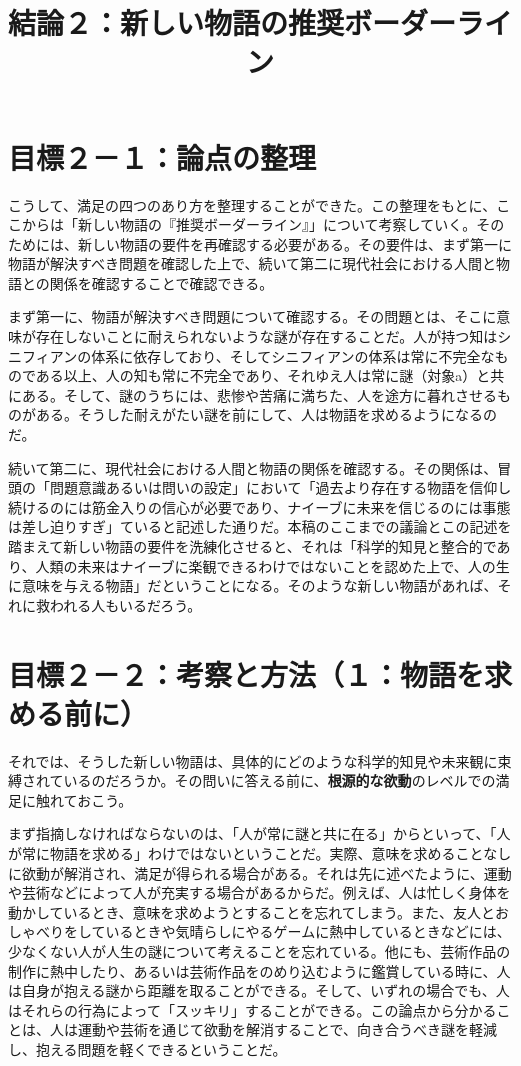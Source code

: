 \documentclass[8pt, a5paper]{ltjsarticle}
\title{結論２：新しい物語の推奨ボーダーライン}
\author{}
\date{}
\begin{document}
\maketitle

\section{目標２－１：論点の整理}\label{ux76eeux6a19uxff12uxff11ux8ad6ux70b9ux306eux6574ux7406}

こうして、満足の四つのあり方を整理することができた。この整理をもとに、ここからは「新しい物語の『推奨ボーダーライン』」について考察していく。そのためには、新しい物語の要件を再確認する必要がある。その要件は、まず第一に物語が解決すべき問題を確認した上で、続いて第二に現代社会における人間と物語との関係を確認することで確認できる。

まず第一に、物語が解決すべき問題について確認する。その問題とは、そこに意味が存在しないことに耐えられないような謎が存在することだ。人が持つ知はシニフィアンの体系に依存しており、そしてシニフィアンの体系は常に不完全なものである以上、人の知も常に不完全であり、それゆえ人は常に謎（対象a）と共にある。そして、謎のうちには、悲惨や苦痛に満ちた、人を途方に暮れさせるものがある。そうした耐えがたい謎を前にして、人は物語を求めるようになるのだ。

続いて第二に、現代社会における人間と物語の関係を確認する。その関係は、冒頭の「問題意識あるいは問いの設定」において「過去より存在する物語を信仰し続けるのには筋金入りの信心が必要であり、ナイーブに未来を信じるのには事態は差し迫りすぎ」ていると記述した通りだ。本稿のここまでの議論とこの記述を踏まえて新しい物語の要件を洗練化させると、それは「科学的知見と整合的であり、人類の未来はナイーブに楽観できるわけではないことを認めた上で、人の生に意味を与える物語」だということになる。そのような新しい物語があれば、それに救われる人もいるだろう。

\section{目標２－２：考察と方法（１：物語を求める前に）}\label{ux76eeux6a19uxff12uxff12ux8003ux5bdfux3068ux65b9ux6cd5uxff11ux7269ux8a9eux3092ux6c42ux3081ux308bux524dux306b}

それでは、そうした新しい物語は、具体的にどのような科学的知見や未来観に束縛されているのだろうか。その問いに答える前に、\textbf{根源的な欲動}のレベルでの満足に触れておこう。

まず指摘しなければならないのは、「人が常に謎と共に在る」からといって、「人が常に物語を求める」わけではないということだ。実際、意味を求めることなしに欲動が解消され、満足が得られる場合がある。それは先に述べたように、運動や芸術などによって人が充実する場合があるからだ。例えば、人は忙しく身体を動かしているとき、意味を求めようとすることを忘れてしまう。また、友人とおしゃべりをしているときや気晴らしにやるゲームに熱中しているときなどには、少なくない人が人生の謎について考えることを忘れている。他にも、芸術作品の制作に熱中したり、あるいは芸術作品をのめり込むように鑑賞している時に、人は自身が抱える謎から距離を取ることができる。そして、いずれの場合でも、人はそれらの行為によって「スッキリ」することができる。この論点から分かることは、人は運動や芸術を通じて欲動を解消することで、向き合うべき謎を軽減し、抱える問題を軽くできるということだ。
\end{document}

